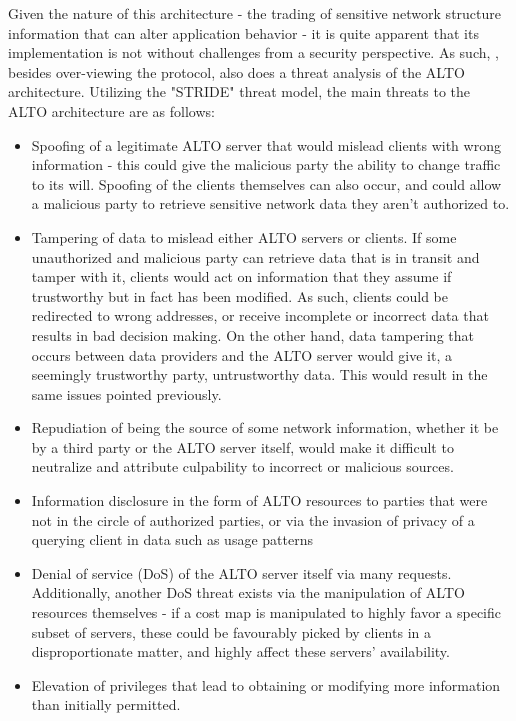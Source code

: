 
    Given the nature of this architecture - the trading of sensitive network structure information that can alter application behavior - it is quite apparent that its implementation is not without challenges from a security perspective.
    As such, \cite{alto-protocol}, besides over-viewing the protocol, also does a threat analysis of the ALTO architecture.
    Utilizing the "STRIDE" threat model, the main threats to the ALTO architecture are as follows:

\begin{itemize}
    \item Spoofing of a legitimate ALTO server that would mislead clients with wrong information - this could give the malicious party the ability to change traffic to its will.
        Spoofing of the clients themselves can also occur, and could allow a malicious party to retrieve sensitive network data they aren't authorized to.
    \item Tampering of data to mislead either ALTO servers or clients.
        If some unauthorized and malicious party can retrieve data that is in transit and tamper with it, clients would act on information that they assume if trustworthy but in fact has been modified.
        As such, clients could be redirected to wrong addresses, or receive incomplete or incorrect data that results in bad decision making.
        On the other hand, data tampering that occurs between data providers and the ALTO server would give it, a seemingly trustworthy party, untrustworthy data.
        This would result in the same issues pointed previously.
    \item Repudiation of being the source of some network information, whether it be by a third party or the ALTO server itself, would make it difficult to neutralize and attribute culpability to incorrect or malicious sources.
    \item Information disclosure in the form of ALTO resources to parties that were not in the circle of authorized parties, or via the invasion of privacy of a querying client in data such as usage patterns
    \item Denial of service (DoS) of the ALTO server itself via many requests.
        Additionally, another DoS threat exists via the manipulation of ALTO resources themselves - if a cost map is manipulated to highly favor a specific subset of servers, these could be favourably picked by clients in a disproportionate matter, and highly affect these servers' availability.
    \item Elevation of privileges that lead to obtaining or modifying more information than initially permitted.
\end{itemize}

